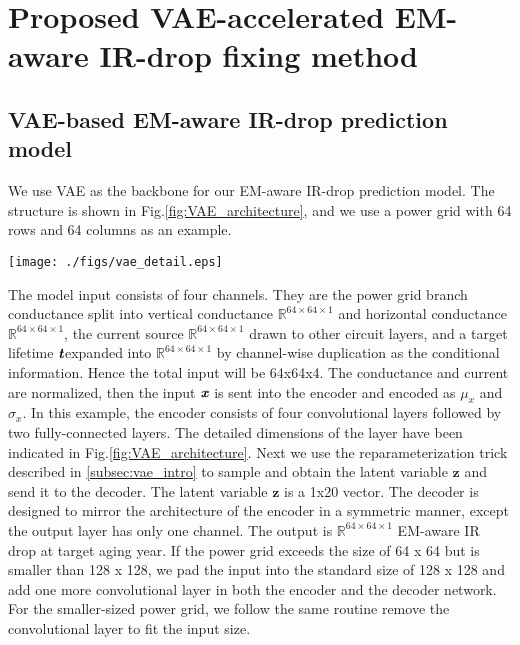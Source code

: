 \section{Proposed VAE-accelerated EM-aware IR-drop fixing method}
\label{sec:strategy}



\subsection{VAE-based EM-aware IR-drop prediction model}
\label{subsec:vae}


We use VAE as the backbone for our EM-aware IR-drop prediction model. The structure is shown in Fig.\ref{fig:VAE_architecture}, and we use a power grid with 64 rows and 64 columns as an example.

\begin{figure*}[h!]
	\centering
	\texttt{[image: ./figs/vae\_detail.eps]}
	\caption{VAE-based model for EM-aware IR drop prediction} 
	\label{fig:VAE_architecture}
\end{figure*}


The model input consists of four channels. They are the power grid branch conductance split into vertical conductance $\mathbb{R} ^{64\times 64\times 1}$ and horizontal conductance $\mathbb{R} ^{64\times 64\times 1}$, the current source $\mathbb{R} ^{64\times 64\times 1}$ drawn to other circuit layers, and a target lifetime $\textit{\textbf{t}} $expanded into $\mathbb{R} ^{64\times 64\times 1}$ by channel-wise duplication as the conditional information. Hence the total input will be 64x64x4. 
The conductance and current are normalized, then the input $\textit{\textbf{x}}$ is sent into the encoder and encoded as $ \mu_{x} $  and $ \sigma_{x}$. 
In this example, the encoder consists of four convolutional layers followed by two fully-connected layers. The detailed dimensions of the layer have been indicated in Fig.\ref{fig:VAE_architecture}. 
Next we use the reparameterization trick described in \ref{subsec:vae_intro} to sample and obtain the latent variable $\textbf{z}$ and send it to the decoder. The latent variable $\textbf{z}$ is a 1x20 vector.
The decoder is designed to mirror the architecture of the encoder in a symmetric manner, except the output layer has only one channel. The output is $\mathbb{R} ^{64\times 64\times 1}$ EM-aware IR drop at target aging year.
If the power grid exceeds the size of 64 x 64 but is smaller than 128 x 128, we pad the input into the standard size of 128 x 128 and add one more convolutional layer in both the encoder and the decoder network. 
For the smaller-sized power grid, we follow the same routine remove the convolutional layer to fit the input size.

